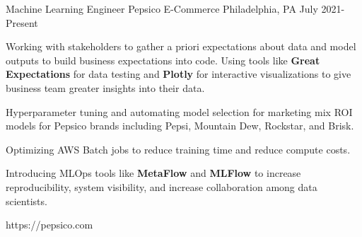 
\begin{cventries}

\cventrylink
{Machine Learning Engineer}
{Pepsico E-Commerce}
{Philadelphia, PA}
{July 2021- Present}
{
\begin{cvitems}
\item{Working with stakeholders to gather a priori expectations about data and model outputs to build business expectations into code. Using tools like \textbf{Great Expectations} for data testing and \textbf{Plotly} for interactive visualizations to give business team greater insights into their data.}
\item{Hyperparameter tuning and automating model selection for marketing mix ROI models for Pepsico brands including Pepsi, Mountain Dew, Rockstar, and Brisk.}
\item{Optimizing AWS Batch jobs to reduce training time and reduce compute costs.}
\item{Introducing MLOps tools like \textbf{MetaFlow} and \textbf{MLFlow} to increase reproducibility, system visibility, and increase collaboration among data scientists.}
\end{cvitems}
}
{https://pepsico.com}




\end{cventries}
